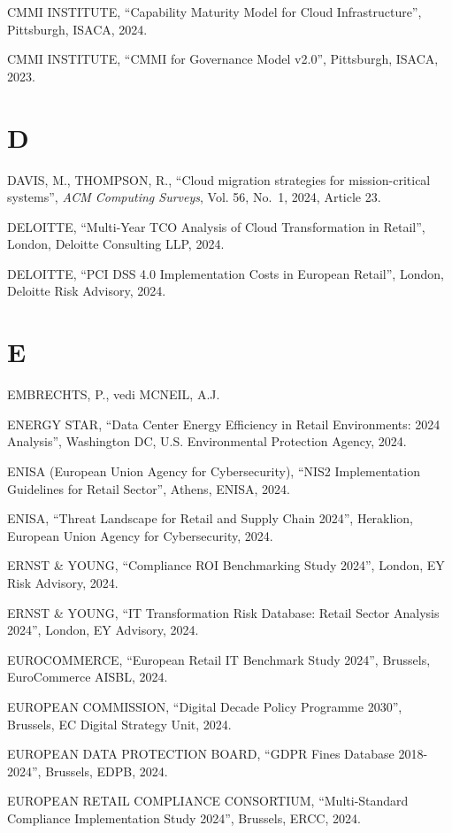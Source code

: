 \documentclass[12pt,a4paper,oneside]{book}
\numberwithin{figure}{chapter} %
\numberwithin{table}{chapter}  %
\begin{document}
CMMI INSTITUTE, ``Capability Maturity Model for Cloud Infrastructure'',
Pittsburgh, ISACA, 2024.

CMMI INSTITUTE, ``CMMI for Governance Model v2.0'', Pittsburgh, ISACA,
2023.

\section{D}\label{d-1}

DAVIS, M., THOMPSON, R., ``Cloud migration strategies for
mission-critical systems'', \emph{ACM Computing Surveys}, Vol. 56,
No.~1, 2024, Article 23.

DELOITTE, ``Multi-Year TCO Analysis of Cloud Transformation in Retail'',
London, Deloitte Consulting LLP, 2024.

DELOITTE, ``PCI DSS 4.0 Implementation Costs in European Retail'',
London, Deloitte Risk Advisory, 2024.

\section{E}\label{e-1}

EMBRECHTS, P., vedi MCNEIL, A.J.

ENERGY STAR, ``Data Center Energy Efficiency in Retail Environments:
2024 Analysis'', Washington DC, U.S. Environmental Protection Agency,
2024.

ENISA (European Union Agency for Cybersecurity), ``NIS2 Implementation
Guidelines for Retail Sector'', Athens, ENISA, 2024.

ENISA, ``Threat Landscape for Retail and Supply Chain 2024'', Heraklion,
European Union Agency for Cybersecurity, 2024.

ERNST \& YOUNG, ``Compliance ROI Benchmarking Study 2024'', London, EY
Risk Advisory, 2024.

ERNST \& YOUNG, ``IT Transformation Risk Database: Retail Sector
Analysis 2024'', London, EY Advisory, 2024.

EUROCOMMERCE, ``European Retail IT Benchmark Study 2024'', Brussels,
EuroCommerce AISBL, 2024.

EUROPEAN COMMISSION, ``Digital Decade Policy Programme 2030'', Brussels,
EC Digital Strategy Unit, 2024.

EUROPEAN DATA PROTECTION BOARD, ``GDPR Fines Database 2018-2024'',
Brussels, EDPB, 2024.

EUROPEAN RETAIL COMPLIANCE CONSORTIUM, ``Multi-Standard Compliance
Implementation Study 2024'', Brussels, ERCC, 2024.
\end{document}
